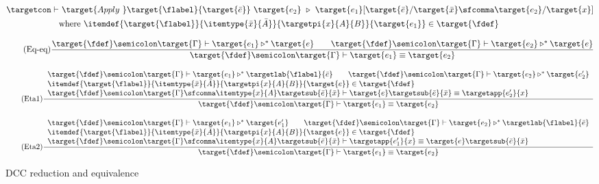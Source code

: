 \begin{figure}
\renewcommand{\arraystretch}{1.3}

	\begin{align*}
		\targetcon \vdash &\ \target{Apply\ } \target{\flabel}\{\target{\bar{e}}\}\ \target{e_2}\ \triangleright\  
		\target{e_1}[\target{\bar{e}} \slash \target{\bar{x}} \sfcomma \target{e_2} \slash \target{x}] \\
		& \text{where } \itemdef{\target{\flabel}}{\itemtype{\bar{x}}{\bar{A}}}{\targetpi{x}{A}{B}}{\target{e_1}} \in \target{\fdef}
	\end{align*}

	\begin{equation}
		\tag{Eq-eq}
		\frac
			{\target{\fdef}\semicolon \target{\Gamma} \vdash \target{e_1} \triangleright^* \target{e} \qquad 
			 \target{\fdef}\semicolon \target{\Gamma} \vdash \target{e_2} \triangleright^* \target{e}}
			{\target{\fdef}\semicolon \target{\Gamma} \vdash \target{e_1} \equiv \target{e_2}}
	\end{equation}

	\begin{equation}
		\tag{Eta1}
		\frac
			{\begin{array}{l}
			  \target{\fdef}\semicolon \target{\Gamma} \vdash \target{e_1} \triangleright^* \targetlab{\flabel}{\bar{e}} \qquad
	          \target{\fdef}\semicolon \target{\Gamma} \vdash \target{e_2} \triangleright^* \target{e_2'} \\
	          \itemdef{\target{\flabel}}{\itemtype{\bar{x}}{\bar{A}}}{\targetpi{x}{A}{B}}{\target{e}} \in \target{\fdef} \\
	          \target{\fdef}\semicolon \target{\Gamma}\sfcomma \itemtype{x}{A} \targetsub{\bar{e}}{\bar{x}} \vdash 
	          \target{e}\targetsub{\bar{e}}{\bar{x}} \equiv \targetapp{e_2'}{x}
        	\end{array}}
			{\target{\fdef}\semicolon \target{\Gamma} \vdash \target{e_1} \equiv \target{e_2}}
	\end{equation}

	\begin{equation}
		\tag{Eta2}
		\frac
			{\begin{array}{l}
			  \target{\fdef}\semicolon \target{\Gamma} \vdash \target{e_1} \triangleright^* \target{e_1'} \qquad
	          \target{\fdef}\semicolon \target{\Gamma} \vdash \target{e_2} \triangleright^* \targetlab{\flabel}{\bar{e}} \\
	          \itemdef{\target{\flabel}}{\itemtype{\bar{x}}{\bar{A}}}{\targetpi{x}{A}{B}}{\target{e}} \in \target{\fdef} \\
	          \target{\fdef}\semicolon \target{\Gamma}\sfcomma \itemtype{x}{A} \targetsub{\bar{e}}{\bar{x}} \vdash 
	          \targetapp{e_1'}{x} \equiv \target{e}\targetsub{\bar{e}}{\bar{x}}
        	\end{array}}
			{\target{\fdef}\semicolon \target{\Gamma} \vdash \target{e_1} \equiv \target{e_2}}
	\end{equation}

	\caption{DCC reduction and equivalence}
    \label{fig:dcc equivalence}
\end{figure}

